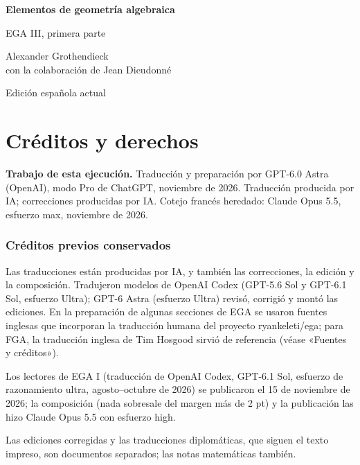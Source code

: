 \documentclass[10pt,oneside,openany]{book}
\theoremstyle{egaenv}\newtheorem*{env}{---}
\theoremstyle{egastatement}
\theoremstyle{egadescription}
\begin{document}
\begin{titlepage}\centering\vspace*{20mm}
{\Huge\bfseries Elementos de geometría algebraica\par}\vspace{14mm}
{\LARGE EGA III, primera parte\par}\vspace{10mm}
{\large Alexander Grothendieck\\con la colaboración de Jean Dieudonné\par}
\vfill{\Large Edición española actual\par}
\vspace{8mm}{\large 25 de noviembre de 2026\par}\end{titlepage}
\chapter*{Créditos y derechos}
\noindent\textbf{Trabajo de esta ejecución.} Traducción y preparación por GPT-6.0 Astra (OpenAI), modo Pro de ChatGPT, noviembre de 2026. Traducción producida por IA; correcciones producidas por IA. Cotejo francés heredado: Claude Opus 5.5, esfuerzo max, noviembre de 2026.

\subsection*{Créditos previos conservados}

Las traducciones están producidas por IA, y también las correcciones, la edición y la composición. Tradujeron
modelos de OpenAI Codex (GPT-5.6 Sol y GPT-6.1 Sol, esfuerzo Ultra); GPT-6 Astra (esfuerzo Ultra) revisó, corrigió
y montó las ediciones. En la
preparación de algunas secciones de EGA se usaron fuentes inglesas que incorporan la traducción humana del proyecto
ryankeleti/ega; para FGA, la traducción inglesa de Tim Hosgood sirvió de referencia (véase «Fuentes y créditos»).

Los lectores de EGA I (traducción de OpenAI Codex, GPT-6.1 Sol, esfuerzo de razonamiento ultra, agosto–octubre
de 2026) se publicaron el 15 de noviembre de 2026; la composición (nada sobresale del margen más de 2 pt) y la
publicación las hizo Claude Opus 5.5 con esfuerzo high.

Las ediciones corregidas y las traducciones diplomáticas, que siguen el texto impreso, son documentos separados; las
notas matemáticas también.
\end{document}
